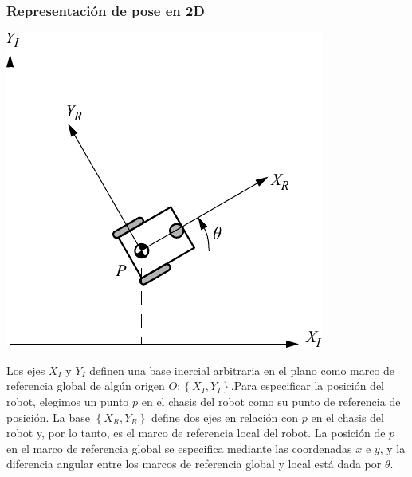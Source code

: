 \begin{frame}
    \frametitle{Representación de pose en 2D}
    \footnotesize

    \begin{center}
        \includegraphics[width=0.4\columnwidth]{./images/coordinate_systems.pdf}
    \end{center}



    Los ejes $X_I$ y $Y_I$ definen una base inercial arbitraria en el plano como marco de referencia global de algún origen $O:\left\lbrace X_I,Y_I \right\rbrace$.Para especificar la posición del robot, elegimos un punto $p$ en el chasis del robot como su punto de referencia de posición. La base $\left\lbrace X_R,Y_R \right\rbrace$ define dos ejes en relación con $p$ en el chasis del robot y, por lo tanto, es el marco de referencia local del robot. La posición de $p$ en el marco de referencia global se especifica mediante las coordenadas $x$ e $y$, y la diferencia angular entre los marcos de referencia global y local está dada por $\theta$.

\end{frame}


